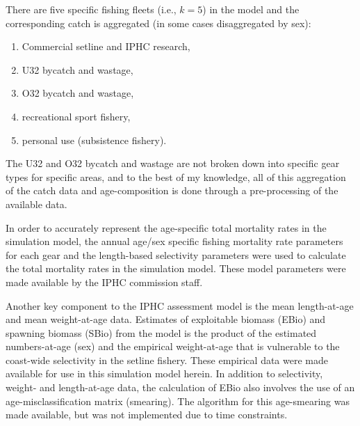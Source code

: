 There are five  specific fishing fleets (i.e., $k=5$) in the model and the corresponding catch is aggregated (in some cases disaggregated by sex):
\begin{enumerate}
	\item Commercial setline  and IPHC research,
	\item U32 bycatch and wastage,
	\item O32 bycatch and wastage,
	\item recreational sport fishery,
	\item personal use (subsistence fishery).
\end{enumerate}
The U32 and O32 bycatch and wastage are not broken down into specific gear types for specific areas, and to the best of my knowledge, all of this aggregation of the catch data and age-composition is done through a pre-processing of the available data.

In order to accurately represent the age-specific total mortality rates in the simulation model, the annual age/sex specific fishing mortality rate parameters for each gear and the length-based selectivity parameters were used to calculate the total mortality rates in the simulation model.  These model parameters were made available by the IPHC commission staff.


Another key component to the IPHC assessment model is the mean length-at-age and mean weight-at-age data. Estimates of exploitable biomass (EBio) and spawning biomass (SBio) from the model is the product of the estimated numbers-at-age (sex) and the empirical weight-at-age that is vulnerable to the coast-wide selectivity in the setline fishery.  These empirical data were made available for use in this simulation model herein.  In addition to selectivity, weight- and length-at-age data, the calculation of EBio also involves the use of an age-misclassification matrix (smearing).  The algorithm for this age-smearing was made available, but was not implemented due to time constraints.


